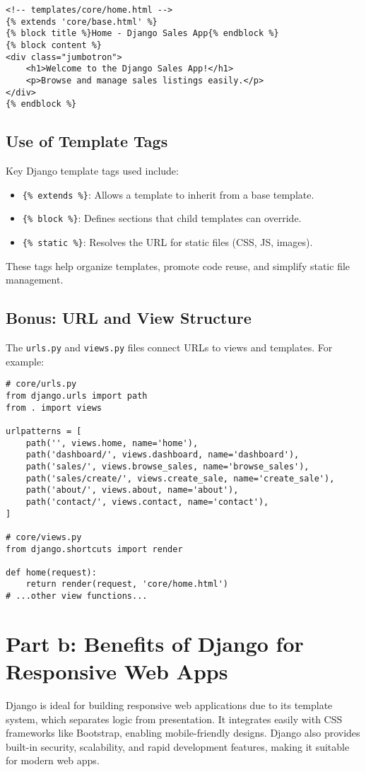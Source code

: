 \documentclass[12pt]{article}
\begin{document}
\begin{verbatim}
<!-- templates/core/home.html -->
{% extends 'core/base.html' %}
{% block title %}Home - Django Sales App{% endblock %}
{% block content %}
<div class="jumbotron">
    <h1>Welcome to the Django Sales App!</h1>
    <p>Browse and manage sales listings easily.</p>
</div>
{% endblock %}
\end{verbatim}

\subsection{Use of Template Tags}
Key Django template tags used include:
\begin{itemize}
    \item \verb|{% extends %}|: Allows a template to inherit from a base template.
    \item \verb|{% block %}|: Defines sections that child templates can override.
    \item \verb|{% static %}|: Resolves the URL for static files (CSS, JS, images).
\end{itemize}
These tags help organize templates, promote code reuse, and simplify static file management.

\subsection{Bonus: URL and View Structure}
The \texttt{urls.py} and \texttt{views.py} files connect URLs to views and templates. 
For example:

\begin{verbatim}
# core/urls.py
from django.urls import path
from . import views

urlpatterns = [
    path('', views.home, name='home'),
    path('dashboard/', views.dashboard, name='dashboard'),
    path('sales/', views.browse_sales, name='browse_sales'),
    path('sales/create/', views.create_sale, name='create_sale'),
    path('about/', views.about, name='about'),
    path('contact/', views.contact, name='contact'),
]

# core/views.py
from django.shortcuts import render

def home(request):
    return render(request, 'core/home.html')
# ...other view functions...
\end{verbatim}

\section{Part b: Benefits of Django for Responsive Web Apps}
Django is ideal for building responsive web applications due to its template system, 
which separates logic from presentation. It integrates easily with CSS frameworks like 
Bootstrap, enabling mobile-friendly designs. Django also provides built-in security, 
scalability, and rapid development features, making it suitable for modern web apps.
\end{document}
